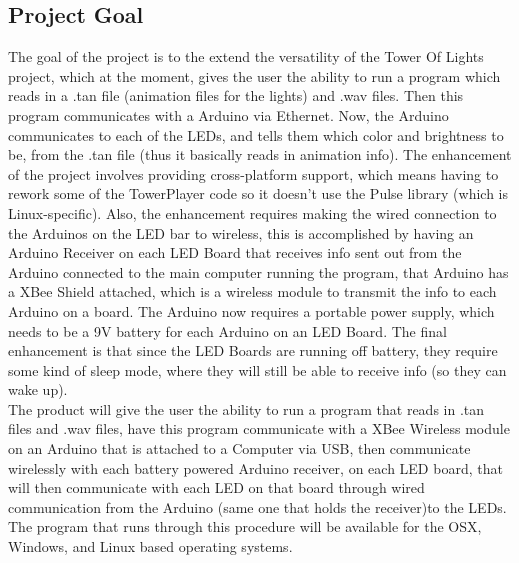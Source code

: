 \documentclass[12pt]{article}
\begin{document}
	\subsection{Project Goal}
	The goal of the project is to the extend the versatility of the Tower Of Lights project, which at the moment, gives the user the ability to run a program which reads in a .tan file (animation files for the lights) and .wav files. Then this
	program communicates with a Arduino via Ethernet. Now, the Arduino communicates to each of the LEDs, and tells them which
	color and brightness to be, from the .tan file (thus it basically reads in animation info). 
	The enhancement of the project involves providing cross-platform support, which means having to rework some of the TowerPlayer code so it doesn't use the Pulse library (which is Linux-specific). Also, the enhancement requires making the wired connection to the Arduinos on the LED bar to wireless, this is accomplished by having an Arduino Receiver on each LED Board that receives info sent out from the Arduino connected to the main computer running the program, that Arduino has a XBee Shield attached, which is a wireless module to transmit the info to each Arduino on a board. The Arduino now requires a portable power supply, which needs to be a 9V battery for each Arduino on an LED Board. The final enhancement is that since the LED Boards are running off battery, they require some kind of sleep mode, where they will still be able to receive info (so they can wake up).\\
	
	The product will give the user the ability to run a program that reads in .tan files and .wav files, have this program communicate with a XBee Wireless module on an Arduino that is attached to a Computer via USB, then communicate wirelessly with each battery powered Arduino receiver, on each LED board, that will then communicate with each LED on that board through wired communication from the Arduino (same one that holds the receiver)to the LEDs. The program that runs through this procedure will be available for the OSX, Windows, and Linux based operating systems.
\end{document}
